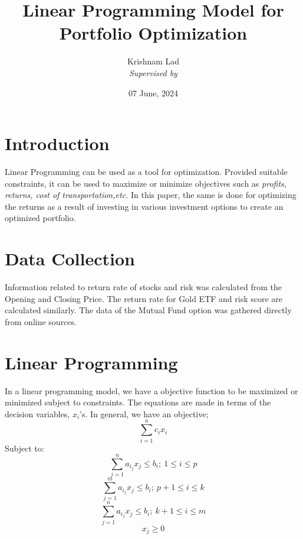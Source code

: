 \documentclass{article}
\title{Linear Programming Model for Portfolio Optimization}
\author{Krishnam Lad\\ \textit{Supervised by \profname}}
\date{07 June, 2024}
\begin{document}
\maketitle

\section{Introduction}
Linear Programming can be used as a tool for optimization. Provided suitable constraints, it can be used to maximize or minimize objectives such as \textit{profits, returns, cost of transportation,etc. } In this paper, the same is done for optimizing the returns as a result of investing in various investment options to create an optimized portfolio. 
\section{Data Collection}
Information related to return rate of stocks and risk  was calculated from the Opening and Closing Price. The return rate for Gold ETF and risk score are calculated similarly. The data of the Mutual Fund option was gathered directly from online sources.
\section{Linear Programming}
In a linear programming model, we have a objective function to be maximized or minimized subject to constraints. The equations are made in terms of the decision variables, $x_i$'s. In general, we have an objective;
\[
\sum_{i=1}^n c_ix_i
\]
Subject to: 
\[
\sum_{j=1}^n a_{i_j}x_j\leq b_i; \    1\leq i\leq p
\]
\[
\sum_{j=1}^m a_{i_j}x_j\leq b_i; \    p+1\leq i\leq k
\]
\[
\sum_{j=1}^n a_{i_j}x_j\leq b_i; \    k+1\leq i\leq m
\]
\[
x_j\geq 0
\]
\end{document}
